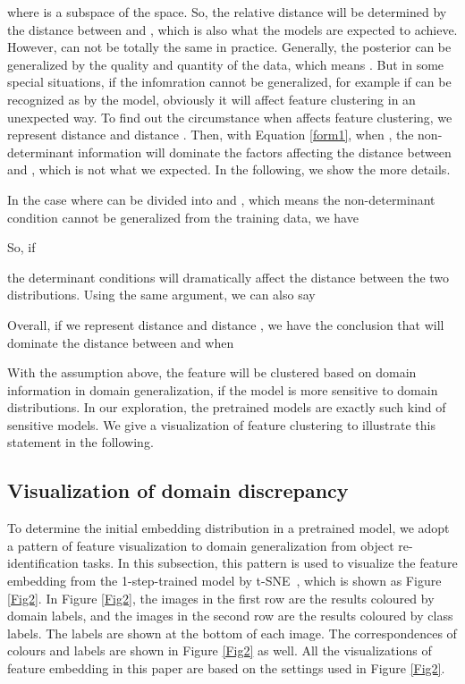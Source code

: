 \documentclass[a4paper,fleqn]{cas-dc}
\begin{document}
where  is a subspace of the  space. So, the relative distance will be determined by the distance between  and , which is also what the models are expected to achieve. However,  can not be totally the same in practice. Generally, the posterior  can be generalized by the quality and quantity of the data, which means . But in some special situations, if the infomration  cannot be generalized, for example if  can be recognized as  by the model, obviously it will affect feature clustering in an unexpected way. To find out the circumstance when  affects feature clustering, we represent distance  and distance .  Then, with Equation \ref{form1}, when , the non-determinant information  will dominate the factors affecting the distance between  and , which is not what we expected. In the following, we show the more details.\par
In the case where  can be divided into  and , which means the non-determinant condition cannot be generalized from the training data, we have 

So, if

the determinant conditions  will dramatically affect the distance between the two distributions. Using the same argument, we can also say 

Overall, if we represent distance  and distance , we have the conclusion that  will dominate the distance between  and  when 
\par
With the assumption above, the feature will be clustered based on domain information in domain generalization, if the model is more sensitive to domain distributions. In our exploration, the pretrained models are exactly such kind of sensitive models. We give a visualization of feature clustering to illustrate this statement in the following. 

\subsection{Visualization of domain discrepancy}
  To determine the initial embedding distribution in a pretrained model, we adopt a pattern of feature visualization to domain generalization from object re-identification tasks. In this subsection, this pattern is used to visualize the feature embedding from the 1-step-trained model by t-SNE~\cite{tsne}, which is shown as Figure \ref{Fig2}. In Figure \ref{Fig2}, the images in the first row are the results coloured by domain labels, and the images in the second row are the results coloured by class labels. The labels are shown at the bottom of each image. The correspondences of colours and labels are shown in Figure \ref{Fig2} as well. All the visualizations of feature embedding in this paper are based on the settings used in Figure \ref{Fig2}.
  
\end{document}

